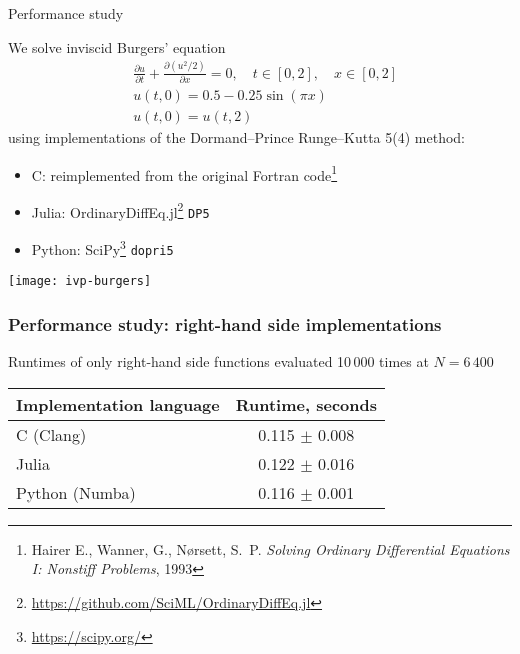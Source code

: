 \documentclass[
  10pt,
  aspectratio=169,
  english,
]{beamer}
\begin{document}
\begin{frame}{Performance study}
  \begin{minipage}{\dimexpr0.6\textwidth - 2\tabcolsep}
  We solve inviscid Burgers' equation
    \begin{align*}
      &\frac{\partial u}{\partial t} + \frac{\partial \left( u^{2} / 2 \right)}{\partial x} = 0,
      \quad t \in [0, 2], \quad x \in [0, 2] \\
      &u(t, 0) = 0.5 - 0.25 \sin \left( \pi x \right)\\
      &u(t, 0) = u(t, 2)
    \end{align*}
  using implementations of the Dormand--Prince Runge--Kutta 5(4) method:
  \begin{itemize}
  \item C: reimplemented from the original Fortran code\footnote{%
  Hairer E., Wanner, G., Nørsett, S.\ P.
  \emph{Solving Ordinary Differential Equations I: Nonstiff Problems}, 1993}
  \item Julia: OrdinaryDiffEq.jl\footnote{%
          \url{https://github.com/SciML/OrdinaryDiffEq.jl}} \texttt{DP5}
  \item Python: SciPy\footnote{\url{https://scipy.org/}} \texttt{dopri5}
  \end{itemize}
  \end{minipage}\hfill
  \begin{minipage}{\dimexpr0.4\textwidth - 2\tabcolsep}
    \texttt{[image: ivp-burgers]}
  \end{minipage}
\end{frame}

\begin{frame}
  \frametitle{Performance study: right-hand side implementations}

  \centering
  Runtimes of only right-hand side functions
  evaluated 10\,000 times at $N=6\,400$
  \vspace{1em}

  \begin{tabular}{l c}
    \toprule
    Implementation language & Runtime, seconds \\
    \midrule
    C (Clang)               & 0.115 \(\pm\) 0.008    \\
    Julia                   & 0.122 \(\pm\) 0.016    \\
    Python (Numba)          & 0.116 \(\pm\) 0.001    \\
    \bottomrule
  \end{tabular}
\end{frame}
\end{document}
